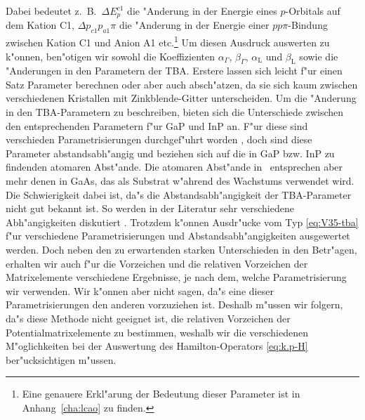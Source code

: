 %
Dabei bedeutet z.~B.\ $\Delta E_{p}^{c1}$ die "Anderung in der Energie eines
$p$-Orbitals auf dem Kation C1, $\Delta p_{c1}p_{a1}\pi$ die "Anderung in der
Energie einer $pp\pi$-Bindung zwischen Kation C1 und Anion A1
etc.\footnote{Eine genauere Erkl"arung der Bedeutung dieser Parameter ist in
  Anhang~\ref{cha:lcao} zu finden.}  Um diesen Ausdruck auswerten zu k"onnen,
ben"otigen wir sowohl die Koeffizienten $\alpha_{\Gamma}$, $\beta_{\Gamma}$,
$\alpha_{\text{L}}$ und $\beta_{\text{L}}$ sowie die "Anderungen in den
Parametern der TBA. Erstere lassen sich leicht f"ur einen Satz Parameter
berechnen oder aber auch absch"atzen, da sie sich kaum zwischen verschiedenen
Kristallen mit Zinkblende-Gitter unterscheiden. Um die "Anderung in den
TBA-Parametern zu beschreiben, bieten sich die Unterschiede zwischen den
entsprechenden Parametern f"ur GaP und InP an. F"ur diese sind verschieden
Parametrisierungen durchgef"uhrt worden \cite{harr:80,chad:77,jsbb:98}, doch
sind diese Parameter abstandsabh"angig und beziehen sich auf die in GaP bzw.
InP zu findenden atomaren Abst"ande. Die atomaren Abst"ande in \GaInP\ 
entsprechen aber mehr denen in GaAs, das als Substrat w"ahrend des Wachstums
verwendet wird. Die Schwierigkeit dabei ist, da"s die Abstandsabh"angigkeit
der TBA-Parameter nicht gut bekannt ist. So werden in der Literatur sehr
verschiedene Abh"angigkeiten diskutiert \cite[p.~504ff]{jsbb:98, harr:80}.
Trotzdem k"onnen Ausdr"ucke vom Typ \eqref{eq:V35-tba} f"ur verschiedene
Parametrisierungen und Abstandsabh"angigkeiten ausgewertet werden. Doch neben
den zu erwartenden starken Unterschieden in den Betr"agen, erhalten wir auch
f"ur die Vorzeichen und die relativen Vorzeichen der Matrixelemente
verschiedene Ergebnisse, je nach dem, welche Parametrisierung wir verwenden.
Wir k"onnen aber nicht sagen, da"s eine dieser Parametrisierungen den anderen
vorzuziehen ist. Deshalb m"ussen wir folgern, da"s diese Methode nicht
geeignet ist, die relativen Vorzeichen der Potentialmatrixelemente zu
bestimmen, weshalb wir die verschiedenen M"oglichkeiten bei der Auswertung des
Hamilton-Operators \eqref{eq:k.p-H} ber"ucksichtigen m"ussen.



